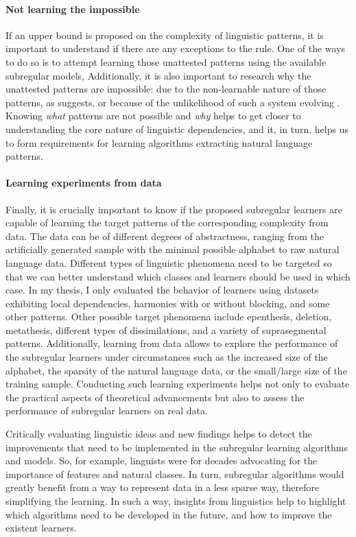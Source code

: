\paragraph{Not learning the impossible}
If an upper bound is proposed on the complexity of linguistic patterns, it is important to understand if there are any exceptions to the rule.
One of the ways to do so is to attempt learning those unattested patterns using the available subregular models,
Additionally, it is also important to research why the unattested patterns are impossible: due to the non-learnable nature of those patterns, as \cite{Lai15} suggests, or because of the unlikelihood of such a system evolving \citep{Blevins2004}.
Knowing \emph{what} patterns are not possible and \emph{why} helps to get closer to understanding the core nature of linguistic dependencies, and it, in turn, helps us to form requirements for learning algorithms extracting natural language patterns.

\paragraph{Learning experiments from data}
Finally, it is crucially important to know if the proposed subregular learners are capable of learning the target patterns of the corresponding complexity from data.
The data can be of different degrees of abstractness, ranging from the artificially generated sample with the minimal possible alphabet to raw natural language data.
Different types of linguistic phenomena need to be targeted so that we can better understand which classes and learners should be used in which case.
In my thesis, I only evaluated the behavior of learners using datasets exhibiting local dependencies, harmonies with or without blocking, and some other patterns.
Other possible target phenomena include epenthesis, deletion, metathesis, different types of dissimilations, and a variety of suprasegmental patterns.
Additionally, learning from data allows to explore the performance of the subregular learners under circumstances such as the increased size of the alphabet, the sparsity of the natural language data, or the small/large size of the training sample.
Conducting such learning experiments helps not only to evaluate the practical aspects of theoretical advancements but also to assess the performance of subregular learners on real data.

\bigskip\bigskip

Critically evaluating linguistic ideas and new findings helps to detect the improvements that need to be implemented in the subregular learning algorithms and models.
So, for example, linguists were for decades advocating for the importance of features and natural classes.
In turn, subregular algorithms would greatly benefit from a way to represent data in a less sparse way, therefore simplifying the learning.
In such a way, insights from linguistics help to highlight which algorithms need to be developed in the future, and how to improve the existent learners.




